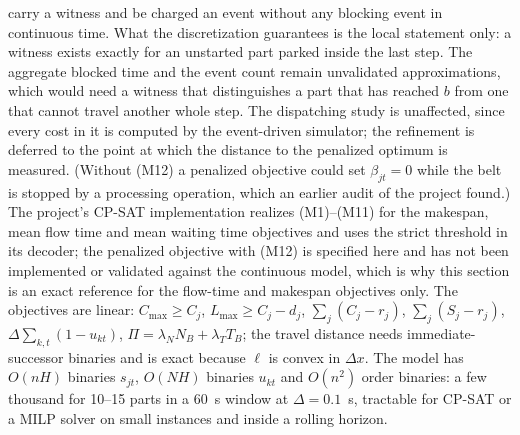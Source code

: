 \documentclass[11pt,a4paper]{article}
\theoremstyle{plain}
\theoremstyle{definition}
\theoremstyle{remark}
\begin{document}
carry a witness and be charged an event without any blocking event in continuous time.
What the discretization guarantees is the local statement only: a witness exists exactly
for an unstarted part parked inside the last step. The aggregate blocked time and the
event count remain unvalidated approximations, which would need a witness that
distinguishes a part that has reached $b$ from one that cannot travel another whole
step. The dispatching study is unaffected, since every cost in it is computed by the
event-driven simulator; the refinement is deferred to the point at which the distance
to the penalized optimum is measured. (Without (M12) a penalized objective could
set $\beta_{jt}=0$ while the belt is stopped by a processing operation, which an earlier
audit of the project found.) The project's CP-SAT implementation realizes (M1)--(M11)
for the makespan, mean flow time and mean waiting time objectives and uses the strict threshold in its decoder;
the penalized objective with (M12) is specified here and has not been implemented or
validated against the continuous model, which is why this section is an exact
reference for the flow-time and makespan objectives only. The objectives are
linear: $C_{\max}\ge C_j$, $L_{\max}\ge C_j-d_j$, $\sum_j(C_j-r_j)$, $\sum_j(S_j-r_j)$,
$\Delta\sum_{k,t}(1-u_{kt})$, $\Pi=\lambda_NN_B+\lambda_TT_B$; the travel distance needs
immediate-successor binaries and is exact because $\ell$ is convex in $\Delta x$. The
model has $O(nH)$ binaries $s_{jt}$, $O(NH)$ binaries $u_{kt}$ and $O(n^2)$ order binaries:
a few thousand for 10--15 parts in a 60~s window at $\Delta=0.1$~s, tractable for CP-SAT or
a MILP solver on small instances and inside a rolling horizon.
\end{document}

